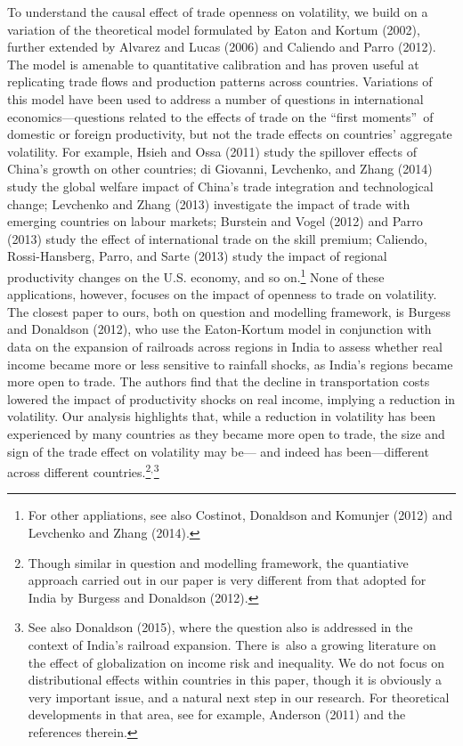 \documentclass[12pt]{article}
\begin{document}
To understand the causal effect of trade openness on volatility, we build on
a variation of the theoretical model formulated by Eaton and Kortum (2002),
further extended by Alvarez and Lucas (2006) and Caliendo and Parro (2012).
The model is amenable to quantitative calibration and has proven useful at
replicating trade flows and production patterns across countries. Variations
of this model have been used to address a number of questions in
international economics---questions related to the effects of trade on the
\textquotedblleft first moments\textquotedblright\ of domestic or foreign
productivity, but not the trade effects on countries' aggregate volatility.
For example, Hsieh and Ossa (2011) study the spillover effects of China's
growth on other countries; di Giovanni, Levchenko, and Zhang (2014) study
the global welfare impact of China's trade integration and technological
change; Levchenko and Zhang (2013) investigate the impact of trade with
emerging countries on labour markets; Burstein and Vogel (2012) and Parro
(2013) study the effect of international trade on the skill premium;
Caliendo, Rossi-Hansberg, Parro, and Sarte (2013) study the impact of
regional productivity changes on the U.S. economy, and so on.\footnote{%
For other appliations, see also Costinot, Donaldson and Komunjer (2012) and
Levchenko and Zhang (2014).} None of these applications, however, focuses on
the impact of openness to trade on volatility. The closest paper to ours,
both on question and modelling framework, is Burgess and Donaldson (2012),
who use the Eaton-Kortum model in conjunction with data on the expansion of
railroads across regions in India to assess whether real income became more
or less sensitive to rainfall shocks, as India's regions became more open to
trade. The authors find that the decline in transportation costs lowered the
impact of productivity shocks on real income, implying a reduction in
volatility. Our analysis highlights that, while a reduction in volatility
has been experienced by many countries as they became more open to trade,
the size and sign of the trade effect on volatility may be--- and indeed has
been---different across different countries.\footnote{%
Though similar in question and modelling framework, the quantiative approach
carried out in our paper is very different from that adopted for India by
Burgess and Donaldson (2012).}$^{,}$\footnote{%
See also Donaldson (2015), where the question also is addressed in the
context of India's railroad expansion. There is\ also a growing literature
on the effect of globalization on income risk and inequality. We do not
focus on distributional effects within countries in this paper, though it is
obviously a very important issue, and a natural next step in our research.
For theoretical developments in that area, see for example, Anderson (2011)
and the references therein.}
\end{document}
